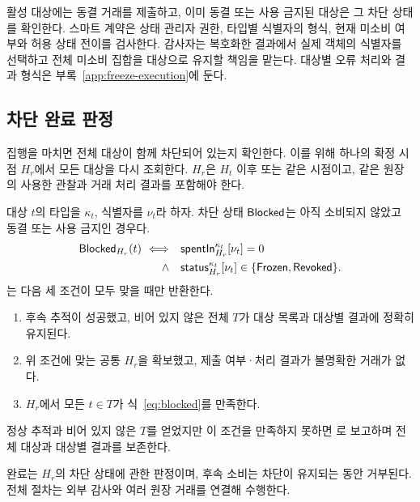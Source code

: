 활성 대상에는 동결 거래를 제출하고, 이미 동결 또는 사용 금지된
대상은 그 차단 상태를 확인한다.
스마트 계약은 상태 관리자 권한, 타입별 식별자의 형식,
현재 미소비 여부와 허용 상태 전이를 검사한다.
감사자는 복호화한 결과에서 실제 객체의 식별자를 선택하고
전체 미소비 집합을 대상으로 유지할 책임을 맡는다.
대상별 오류 처리와 결과 형식은 부록~\ref{app:freeze-execution}에 둔다.

\subsection{차단 완료 판정}

집행을 마치면 전체 대상이 함께 차단되어 있는지 확인한다.
이를 위해 하나의 확정 시점 $H_r$에서 모든 대상을 다시 조회한다.
$H_r$은 $H_t$ 이후 또는 같은 시점이고, 같은 원장의 사용한 관찰과
거래 처리 결과를 포함해야 한다.

대상 $t$의 타입을 $\kappa_t$, 식별자를 $\nu_t$라 하자.
차단 상태 $\mathsf{Blocked}$는 아직 소비되지 않았고 동결 또는 사용 금지인 경우다.
\begin{equation}
 \begin{aligned}
 \mathsf{Blocked}_{H_r}(t)\ \Longleftrightarrow\quad
 &\mathsf{spentIn}^{\kappa_t}_{H_r}[\nu_t]=0\\
 {}\land\quad
 &\mathsf{status}^{\kappa_t}_{H_r}[\nu_t]\in\{\textsf{Frozen},\textsf{Revoked}\}.
 \end{aligned}
 \label{eq:blocked}
\end{equation}
는 다음 세 조건이 모두 맞을 때만 반환한다.
\begin{enumerate}
\item 후속 추적이 성공했고, 비어 있지 않은 전체 $T$가 대상 목록과
대상별 결과에 정확히 유지된다.
\item 위 조건에 맞는 공통 $H_r$을 확보했고,
제출 여부·처리 결과가 불명확한 거래가 없다.
\item $H_r$에서 모든 $t\in T$가 식~\eqref{eq:blocked}를 만족한다.
\end{enumerate}
정상 추적과 비어 있지 않은 $T$를 얻었지만 이 조건을 만족하지 못하면
로 보고하며 전체 대상과 대상별 결과를 보존한다.

완료는 $H_r$의 차단 상태에 관한 판정이며,
후속 소비는 차단이 유지되는 동안 거부된다.
전체 절차는 외부 감사와 여러 원장 거래를 연결해 수행한다.

